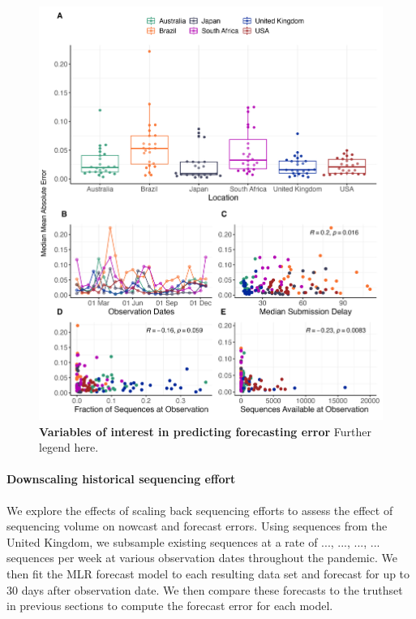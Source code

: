 \documentclass[11pt,oneside,letterpaper]{article}
\begin{document}
\begin{figure}[H]
	\centering
    \includegraphics[width=1.1\textwidth]{figures/Var_of_interest.png}
	\caption{\textbf{Variables of interest in predicting forecasting error}
	Further legend here.
	}
	\label{Figure 4}
\end{figure}

\paragraph{Downscaling historical sequencing effort}

We explore the effects of scaling back sequencing efforts to assess the effect of sequencing volume on nowcast and forecast errors.
Using sequences from the United Kingdom, we subsample existing sequences at a rate of ..., ..., ..., ... sequences per week at various observation dates throughout the pandemic.
We then fit the MLR forecast model to each resulting data set and forecast for up to 30 days after observation date.
We then compare these forecasts to the truthset in previous sections to compute the forecast error for each model.
\end{document}

